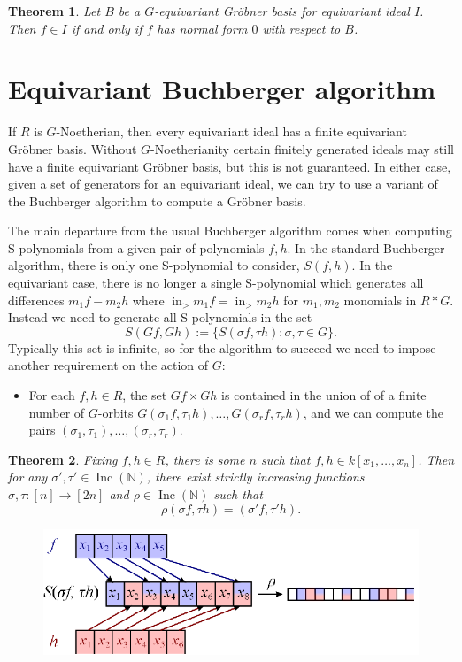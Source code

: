 \documentclass{amsart}
\newtheorem{theorem}{Theorem}[section]
\theoremstyle{definition}
\theoremstyle{remark}
\numberwithin{equation}{section}
\newcommand{\B}[1]{\mathbb #1}
\newcommand{\<}{\langle}
\renewcommand{\>}{\rangle}
\newcommand{\LT}{\operatorname{in}_>}
\newcommand{\Inc}{\operatorname{Inc}(\B N)}
\begin{document}
\begin{theorem}
Let $B$ be a $G$-equivariant Gr\"obner basis for equivariant ideal $I$.  Then $f \in I$ if and only if $f$ has normal form $0$ with respect to $B$.
\end{theorem}

\section{Equivariant Buchberger algorithm}
If $R$ is $G$-Noetherian, then every equivariant ideal has a finite equivariant Gr\"obner basis.  Without $G$-Noetherianity certain finitely generated ideals may still have a finite equivariant Gr\"obner basis, but this is not guaranteed.  In either case, given a set of generators for an equivariant ideal, we can try to use a variant of the Buchberger algorithm to compute a Gr\"obner basis.

The main departure from the usual Buchberger algorithm comes when computing S-polynomials from a given pair of polynomials $f,h$.  In the standard Buchberger algorithm, there is only one S-polynomial to consider, $S(f,h)$.  In the equivariant case, there is no longer a single S-polynomial which generates all differences $m_1f - m_2h$ where $\LT m_1f = \LT m_2h$ for $m_1,m_2$ monomials in $R*G$.  Instead we need to generate all S-polynomials in the set
 \[ S(Gf,Gh) := \{ S(\sigma f, \tau h): \sigma,\tau \in G\}. \]
Typically this set is infinite, so for the algorithm to succeed we need to impose another requirement on the action of $G$:
\begin{itemize}
 \item For each $f,h \in R$, the set $Gf \times Gh$ is contained in the union of of a finite number of $G$-orbits $G(\sigma_1 f, \tau_1 h),\ldots,G(\sigma_r f, \tau_r h)$, and we can compute the pairs $(\sigma_1,\tau_1),\ldots,(\sigma_r,\tau_r)$.
\end{itemize}

\begin{theorem}
 Fixing $f,h \in R$, there is some $n$ such that $f,h \in k[x_1,\ldots,x_n]$.  Then for any $\sigma', \tau' \in \Inc$, there exist strictly increasing functions $\sigma,\tau: [n] \to [2n]$ and $\rho \in \Inc$ such that
  \[ \rho (\sigma f, \tau h) = (\sigma' f, \tau' h). \]
\end{theorem}

\begin{figure}[h]
  \centering
  \includegraphics[width=.7\textwidth]{incmap.ps}
\end{figure}
\end{document}
